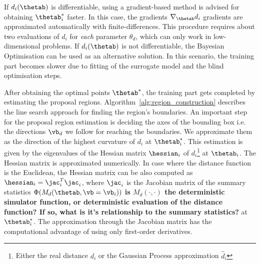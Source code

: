 If $d_i(\thetab)$ is differentiable, using a gradient-based method is
advised for obtaining $\thetab_i^*$ faster. In this case, the
gradients $\nabla_{\thetab} d_i$ gradients are approximated
automatically with finite-differences. This procedure requires about
two evaluations of $d_i$ for \emph{each} parameter $\theta_d$, which
can only work in low-dimensional problems. If $d_i(\thetab)$ is not
differentiable, the Bayesian Optimisation can be used as an
alternative solution. In this scenario, the training part becomes
slower due to fitting of the surrogate model and the blind
optimisation steps.

After obtaining the optimal points $\thetab^*$, the training part gets
completed by estimating the proposal
regions. Algorithm~\ref{alg:region_construction} describes the line
search approach for finding the region's boundaries. An important step
for the proposal region estimation is deciding the axes of the
bounding box i.e. the directions $\vb_d$ we follow for reaching the
boundaries. We approximate them as the direction of the highest
curvature of $d_i$ at $\thetab_i^*$. This estimation is given by the
eigenvalues of the Hessian matrix $\hessian_i$ of
$d_i$\footnote{Either the real distance $d_i$ or the Gaussian Process
  approximation $\hat{d}_i$} at $\thetab_i$. The Hessian matrix is
approximated numerically. In case where the distance function is the
Euclidean, the Hessian matrix can be also computed as
$\hessian_i = \jac_i^T\jac_i$, where $\jac_i$ is the Jacobian matrix
of the summary statistics $\Phi(M_d(\thetab, \vb=\vb_i))$ \textbf{is 
$M_d(\cdot, \cdot)$ the deterministic simulator function, or deterministic 
evaluation of the distance function? If so, what is it's relationship to 
the summary statistics?} at
$\thetab_i^*$. The approximation through the Jacobian matrix has the
computational advantage of using only first-order derivatives.

